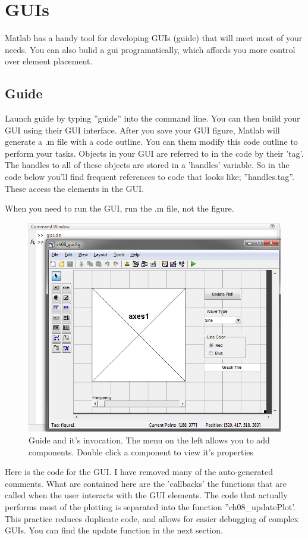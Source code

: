 
\pagebreak
\section{GUIs}
Matlab has a handy tool for developing GUIs (guide) that will meet most of your needs.
 You can also bulid a gui programatically, which affords you more control over element placement.

\subsection{Guide}
Launch guide by typing ''guide'' into the command line.
 You can then build your GUI using their GUI interface.
 After you save your GUI figure, Matlab will generate a .m file with a code outline.
 You can them modify this code outline to perform your tasks.
 Objects in your GUI are referred to in the code by their 'tag'.
 The handles to all of these objects are stored in a 'handles' variable.
 So in the code below you'll find frequent references to code that looks like; ''handles.tag''.
 These access the elements in the GUI.

When you need to run the GUI, run the .m file, not the figure.

\begin{figure}[ht!]
\centering
\includegraphics[width=120mm]{img/guide.png}
\caption{Guide and it's invocation.
 The menu on the left allows you to add components.
 Double click a component to view it's properties}
\label{guiload}
\end{figure}

\pagebreak
Here is the code for the GUI.
 I have removed many of the auto-generated comments.
 What are contained here are the 'callbacks' the functions that are called when the user interacts with the GUI elements.
 The code that actually performs most of the plotting is separated into the function ''ch08_updatePlot'.
 This practice reduces duplicate code, and allows for easier debugging of complex GUIs.
 You can find the update function in the next section.

